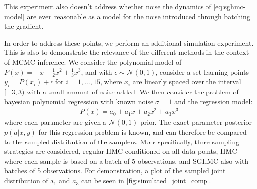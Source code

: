 This experiment also doesn't address whether noise the dynamics of \cref{eq:sghmc-model} are even reasonable as a model for the noise introduced through batching the gradient. 

In order to address these points, we perform an additional simulation experiment. 
This is also to demonstrate the relevance of the different methods in the context of MCMC inference.
We consider the polynomial model of $P(x) = -x + \frac{1}{2}x^2 + \frac{1}{3}x^3$, 
and with $\epsilon \sim \mathcal{N}(0, 1)$, consider a set learning points $y_i = P(x_i) + \epsilon$ for $i=1,\dots,15$, where $x_i$ are linearly spaced over the interval $[-3, 3)$ with a small amount of noise added. 
We then consider the problem of bayesian polynomial regression with known noise $\sigma=1$ and the regression model:
\begin{align*}
    P(x) = a_0 + a_1 x+a_2 x^2 + a_3 x^3
\end{align*}
where each parameter are given a $\mathcal{N}(0, 1)$ prior.
The exact parameter posterior $p(a|x,y)$ for this regression problem is known, and can therefore be compared to the sampled distribution of the samplers. 
More specifically, three sampling strategies are considered, regular HMC conditioned on all data points, HMC where each sample is based on a batch of 5 observations, and SGHMC also with batches of 5 observations.
For demonstration, a plot of the sampled joint distribution of $a_1$ and $a_3$ can be seen in \cref{fig:simulated_joint_comp}.
